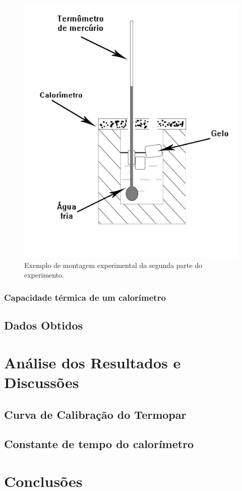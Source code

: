 \documentclass[12pt,a4paper]{article}
\begin{document}
\begin{figure}[!htbp]
\centering
\includegraphics[scale=0.55]{Fig6b2.jpg}
\caption{Exemplo de montagem experimental da segunda parte do experimento.}
\label{CalorGelo}
\end{figure}



\subsubsection{Capacidade térmica de um calorímetro}


\subsection{Dados Obtidos}


\section{Análise dos Resultados e Discussões}


\subsection{Curva de Calibração do Termopar}

\subsection{Constante de tempo do calorímetro}


\section{Conclusões}
\end{document}
